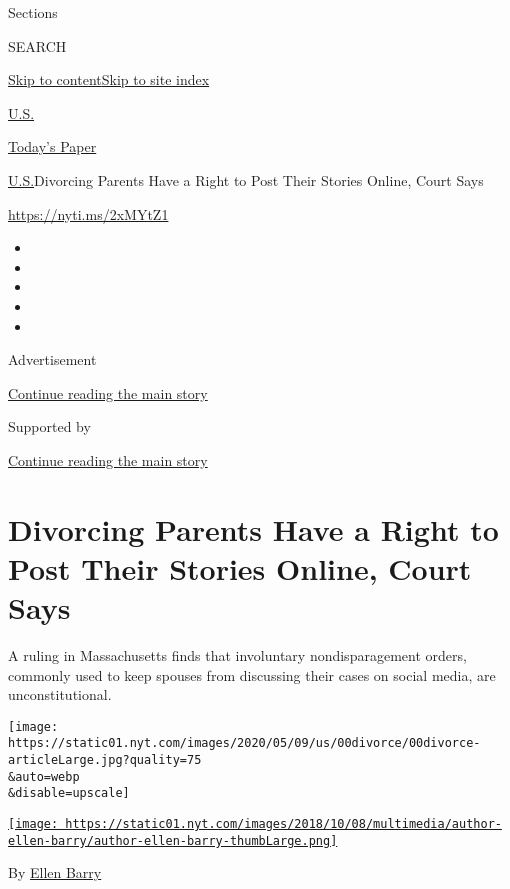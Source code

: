 Sections

SEARCH

\protect\hyperlink{site-content}{Skip to
content}\protect\hyperlink{site-index}{Skip to site index}

\href{https://www.nytimes.com/section/us}{U.S.}

\href{https://myaccount.nytimes.com/auth/login?response_type=cookie\&client_id=vi}{}

\href{https://www.nytimes.com/section/todayspaper}{Today's Paper}

\href{/section/us}{U.S.}\textbar{}Divorcing Parents Have a Right to Post
Their Stories Online, Court Says

\url{https://nyti.ms/2xMYtZ1}

\begin{itemize}
\item
\item
\item
\item
\item
\end{itemize}

Advertisement

\protect\hyperlink{after-top}{Continue reading the main story}

Supported by

\protect\hyperlink{after-sponsor}{Continue reading the main story}

\hypertarget{divorcing-parents-have-a-right-to-post-their-stories-online-court-says}{%
\section{Divorcing Parents Have a Right to Post Their Stories Online,
Court
Says}\label{divorcing-parents-have-a-right-to-post-their-stories-online-court-says}}

A ruling in Massachusetts finds that involuntary nondisparagement
orders, commonly used to keep spouses from discussing their cases on
social media, are unconstitutional.

\texttt{[image: https://static01.nyt.com/images/2020/05/09/us/00divorce/00divorce-articleLarge.jpg?quality=75\\\&auto=webp\\\&disable=upscale]}

\href{https://www.nytimes.com/by/ellen-barry}{\texttt{[image: https://static01.nyt.com/images/2018/10/08/multimedia/author-ellen-barry/author-ellen-barry-thumbLarge.png]}}

By \href{https://www.nytimes.com/by/ellen-barry}{Ellen Barry}


